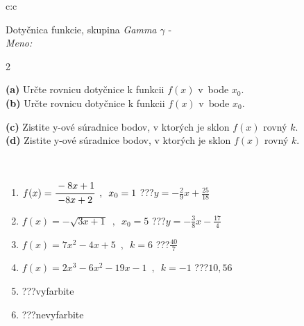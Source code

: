 \documentclass[10pt]{report}
\begin{document}
\begin{tabular}{c:c}
\begin{minipage}[c][104.5mm][t]{0.5\linewidth}
\begin{center}
\vspace{7mm}
{\huge Dotyčnica funkcie, skupina \textit{Gamma $\gamma$} -}\\[5mm]
\textit{Meno:}\phantom{xxxxxxxxxxxxxxxxxxxxxxxxxxxxxxxxxxxxxxxxxxxxxxxxxxxxxxxxxxxxxxxxx}\\[5mm]
\begin{minipage}{0.95\linewidth}
\begin{center}
{\small \begin{multicols}{2} \raggedright
\textbf{(a)} Určte rovnicu dotyčnice k funkcii \(f(x)\) v~bode \(x_0\). \\[1mm]
\textbf{(b)} Určte rovnicu dotyčnice k funkcii \(f(x)\) v~bode \(x_0\). \par \columnbreak
\textbf{(c)} Zistite y-ové súradnice bodov, v ktorých je sklon \(f(x)\) rovný \(k\). \\[1mm]
\textbf{(d)} Zistite y-ové súradnice bodov, v ktorých je sklon \(f(x)\) rovný \(k\). \\[1mm]
\end{multicols}
}
\end{center}
\end{minipage}
\\[4mm]
\begin{minipage}{0.79\linewidth}
\begin{center}
\begin{varwidth}{\linewidth}
\begin{enumerate}
\normalsizerr
\item $f(x)=\cfrac{-8x+1}{-8x+2}\enspace , \enspace x_0=1$\quad \dotfill\; ???\;\dotfill \quad $y = -\frac{2}{9}x+\frac{25}{18}$
\item $f(x)=-\sqrt{3x+1}\enspace , \enspace x_0=5$\quad \dotfill\; ???\;\dotfill \quad $y = -\frac{3}{8}x-\frac{17}{4}$
\item $f(x)=7x^2-4x+5\enspace , \enspace k=6$\quad \dotfill\; ???\;\dotfill \quad $\frac{40}{7}$
\item $f(x)=2x^3-6x^2-19x-1\enspace , \enspace k=-1$\quad \dotfill\; ???\;\dotfill \quad $10 , 56$
\item \quad \dotfill\; ???\;\dotfill \quad vyfarbite
\item \quad \dotfill\; ???\;\dotfill \quad nevyfarbite
\end{enumerate}
\end{varwidth}

\end{center}
\end{minipage}
\end{center}
\end{minipage}
\end{tabular}
\end{document}
